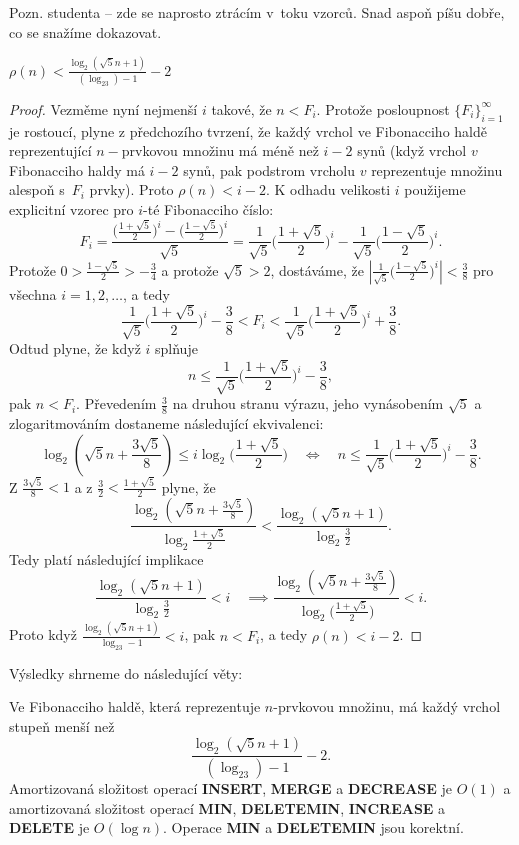 \documentclass[a4paper,12pt]{article}
\begin{document}
Pozn. studenta -- zde se naprosto ztrácím v~toku vzorců. Snad aspoň píšu dobře, co se snažíme dokazovat.

\begin{lemma}
    $\rho (n)<\frac {\log_2(\sqrt 5n+1)}{(\log_23)-1}-2$
\end{lemma}
\begin{proof}
Vezměme nyní nejmenší $i$ takové, že $
n<F_i$. Protože 
posloupnost $\{F_i\}_{i=1}^{\infty}$ je rostoucí, plyne z předchozího 
tvrzení, že každý vrchol ve Fibonacciho haldě 
reprezentující $n-$prvkovou množinu má méně než $
i-2$ 
synů (když vrchol $v$ Fibonacciho haldy má $i-2$ 
synů, pak podstrom vrcholu $v$ reprezentuje 
množinu alespoň s~$F_i$ prvky). Proto $\rho (n)<i-2$. K odhadu 
velikosti $i$ použijeme explicitní vzorec 
pro $i$-té Fibonacciho číslo: 
$$F_i=\frac {\big(\frac {1+\sqrt 5}2\big)^i-\big(\frac {1-\sqrt 5}
2\big)^i}{\sqrt 5}=\frac 1{\sqrt 5}\big(\frac {1+\sqrt 5}2\big)^i
-\frac 1{\sqrt 5}\big(\frac {1-\sqrt 5}2\big)^i.$$
Protože $0>\frac {1-\sqrt 5}2>-\frac 34$ a protože $\sqrt 5
>2$, dostáváme, že $|\frac 1{\sqrt 5}\big(\frac {1-\sqrt 5}
2\big)^i|<\frac 38$ pro všechna 
$i=1,2,\dots$, a tedy 
$$\frac 1{\sqrt 5}\big(\frac {1+\sqrt 5}2\big)^i-\frac 38<F_i<\frac 
1{\sqrt 5}\big(\frac {1+\sqrt 5}2\big)^i+\frac 38.$$
Odtud plyne, že když $i$ splňuje 
$$n\le\frac 1{\sqrt 5}\big(\frac {1+\sqrt 5}2\big)^i-\frac 38,$$
pak $n<F_i$. 
Převedením $\frac 38$ na druhou stranu výrazu, jeho 
vynásobením $\sqrt 5$ a zlogaritmováním dostaneme následující 
ekvivalenci: 
$$\log_2(\sqrt 5n+\frac {3\sqrt 5}8)\le i\log_2\big(\frac {1+\sqrt 
5}2\big)\quad\Leftrightarrow\quad n\le\frac 1{\sqrt 5}\big(\frac {
1+\sqrt 5}2\big)^i-\frac 38.$$
Z $\frac {3\sqrt 5}8<1$ a z $\frac 32<\frac {1+\sqrt 5}2$ plyne, že 
$$\frac {\log_2(\sqrt 5n+\frac {3\sqrt 5}8)}{\log_2\frac {1+\sqrt 
5}2}<\frac {\log_2(\sqrt 5n+1)}{\log_2\frac 32}.$$
Tedy platí následující implikace
$$\frac {\log_2(\sqrt 5n+1)}{\log_2\frac 32}<i\quad\implies\frac {\log_
2(\sqrt 5n+\frac {3\sqrt 5}8)}{\log_2\big(\frac {1+\sqrt 5}2\big)}
<i.$$
Proto když $\frac {\log_2(\sqrt 5n+1)}{\log_23-1}<i$, pak $n<F_
i$, a tedy $\rho (n)<i-2$.\end{proof}

Výsledky shrneme do následující věty: 

\begin{veta}Ve Fibonacciho haldě, která   
reprezentuje $n$-prvkovou množinu, má každý vrchol 
stu\-peň menší než 
$$\frac {\log_2(\sqrt 5n+1)}{(\log_23)-1}-2.$$
Amortizovaná složitost operací {\bf INSERT}, {\bf MERGE} a {\bf DECREASE }
je $O(1)$ a amortizovaná složitost operací {\bf MIN}, 
{\bf DE\-LE\-TE\-MIN}, {\bf INCREASE} a {\bf DELETE} je $O(\log n
)$. Operace {\bf MIN }
a {\bf DELETEMIN} jsou korektní.
\end{veta}
\end{document}
